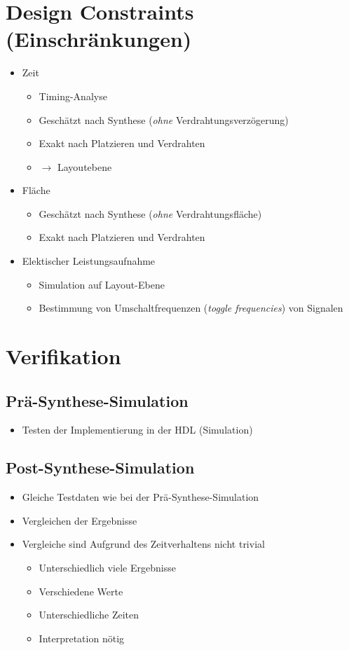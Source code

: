 	\section{Design Constraints (Einschränkungen)}
		\begin{itemize}
			\item Zeit
				\begin{itemize}
					\item Timing-Analyse
					\item Geschätzt nach Synthese (\textit{ohne} Verdrahtungsverzögerung)
					\item Exakt nach Platzieren und Verdrahten
					\item $ \rightarrow $ Layoutebene
				\end{itemize}
			\item Fläche
				\begin{itemize}
					\item Geschätzt nach Synthese (\textit{ohne} Verdrahtungsfläche)
					\item Exakt nach Platzieren und Verdrahten
				\end{itemize}
			\item Elektischer Leistungsaufnahme
				\begin{itemize}
					\item Simulation auf Layout-Ebene
					\item Bestimmung von Umschaltfrequenzen (\textit{toggle frequencies}) von Signalen
				\end{itemize}
		\end{itemize}

	\section{Verifikation}
		\subsection{Prä-Synthese-Simulation}
			\begin{itemize}
				\item Testen der Implementierung in der HDL (Simulation)
			\end{itemize}

		\subsection{Post-Synthese-Simulation}
			\begin{itemize}
				\item Gleiche Testdaten wie bei der Prä-Synthese-Simulation
				\item Vergleichen der Ergebnisse
				\item Vergleiche sind Aufgrund des Zeitverhaltens nicht trivial
					\begin{itemize}
						\item Unterschiedlich viele Ergebnisse
						\item Verschiedene Werte
						\item Unterschiedliche Zeiten
						\item Interpretation nötig
					\end{itemize}
			\end{itemize}

